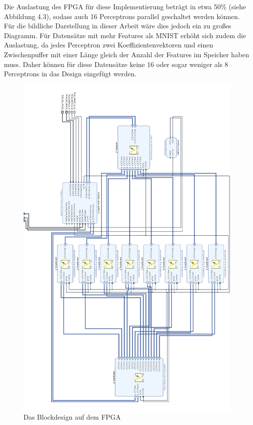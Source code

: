 Die Auslastung des FPGA für diese Implementierung beträgt in etwa 50\% (siehe Abbildung 4.3), sodass auch 16 Perceptrons parallel geschaltet werden können. Für die bildliche Darstellung in dieser Arbeit wäre dies jedoch ein zu großes Diagramm. Für Datensätze mit mehr Features als MNIST erhöht sich zudem die Auslastung, da jedes Perceptron zwei Koeffizientenvektoren und einen Zwischenpuffer mit einer Länge gleich der Anzahl der Features im Speicher haben muss. Daher können für diese Datensätze keine 16 oder sogar weniger als 8 Perceptrons in das Design eingefügt werden.
 \begin{figure}[ht]
\centering
\includegraphics[scale=0.7]{bilder/blockdesign}
\caption{Das Blockdesign auf dem FPGA}
\end{figure}\\

